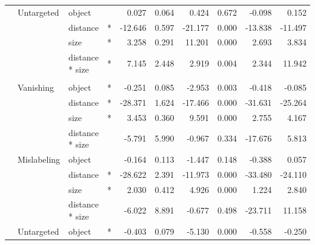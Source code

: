 \begin{longtable}[t]{llllrrrrrr}
\cmidrule{2-10}\nopagebreak
\hspace{1em} & Untargeted & object &  & 0.027 & 0.064 & 0.424 & 0.672 & -0.098 & 0.152\\
\cmidrule{3-10}\nopagebreak
\hspace{1em} &  & distance & * & -12.646 & 0.597 & -21.177 & 0.000 & -13.838 & -11.497\\
\cmidrule{3-10}\nopagebreak
\hspace{1em} &  & size & * & 3.258 & 0.291 & 11.201 & 0.000 & 2.693 & 3.834\\
\cmidrule{3-10}\nopagebreak
\hspace{1em} &  & distance * size & * & 7.145 & 2.448 & 2.919 & 0.004 & 2.344 & 11.942\\
\cmidrule{1-10}\pagebreak[0]
\addlinespace[0.3em]
\multicolumn{10}{l}{\textbf{RetinaNet}}\\
\hspace{1em} & Vanishing & object & * & -0.251 & 0.085 & -2.953 & 0.003 & -0.418 & -0.085\\
\cmidrule{3-10}\nopagebreak
\hspace{1em} &  & distance & * & -28.371 & 1.624 & -17.466 & 0.000 & -31.631 & -25.264\\
\cmidrule{3-10}\nopagebreak
\hspace{1em} &  & size & * & 3.453 & 0.360 & 9.591 & 0.000 & 2.755 & 4.167\\
\cmidrule{3-10}\nopagebreak
\hspace{1em} &  & distance * size &  & -5.791 & 5.990 & -0.967 & 0.334 & -17.676 & 5.813\\
\cmidrule{2-10}\nopagebreak
\hspace{1em} & Mislabeling & object &  & -0.164 & 0.113 & -1.447 & 0.148 & -0.388 & 0.057\\
\cmidrule{3-10}\nopagebreak
\hspace{1em} &  & distance & * & -28.622 & 2.391 & -11.973 & 0.000 & -33.480 & -24.110\\
\cmidrule{3-10}\nopagebreak
\hspace{1em} &  & size & * & 2.030 & 0.412 & 4.926 & 0.000 & 1.224 & 2.840\\
\cmidrule{3-10}\nopagebreak
\hspace{1em} &  & distance * size &  & -6.022 & 8.891 & -0.677 & 0.498 & -23.711 & 11.158\\
\cmidrule{2-10}\nopagebreak
\hspace{1em} & Untargeted & object & * & -0.403 & 0.079 & -5.130 & 0.000 & -0.558 & -0.250\\

\end{longtable}
